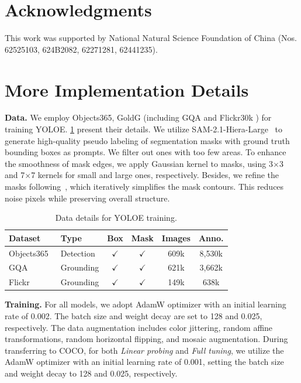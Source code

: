 \documentclass[10pt,twocolumn,letterpaper]{article}
\begin{document}
\section{Acknowledgments}
This work was supported by National Natural Science Foundation of China (Nos. 62525103, 624B2082, 62271281, 62441235).

{
    \small
    
    
}

\appendix

\section{More Implementation Details}
\textbf{Data.} We employ Objects365\cite{shao2019objects365}, GoldG \cite{kamath2021mdetr} (including GQA\cite{hudson2019gqa} and Flickr30k \cite{plummer2015flickr30k}) for training YOLOE. \cref{tab:dataset} present their details. We utilize SAM-2.1-Hiera-Large~\cite{ravi2024sam2} to generate high-quality pseudo labeling of segmentation masks with ground truth bounding boxes as prompts. We filter out ones with too few areas. To enhance the smoothness of mask edges, we apply Gaussian kernel to masks, using 3$\times$3 and 7$\times$7 kernels for small and large ones, respectively. Besides, we refine the masks following~\cite{douglas1973polydp}, which iteratively simplifies the mask contours. This reduces noise pixels while preserving overall structure.

\begin{table}[h]
\centering
\caption{Data details for YOLOE training.}
\label{tab:dataset}
\small
\setlength{\tabcolsep}{3pt}
\begin{tabular}{llcccc} 
\toprule
Dataset & Type & Box & Mask & Images & Anno. \\ 
\midrule
Objects365~\cite{shao2019objects365} & Detection & $\checkmark$ & $\checkmark$ & 609k & 8,530k \\
GQA~\cite{hudson2019gqa} & Grounding & $\checkmark$ & $\checkmark$ & 621k & 3,662k \\
Flickr~\cite{plummer2015flickr30k} & Grounding & $\checkmark$ & $\checkmark$ & 149k & 638k \\
\bottomrule
\end{tabular}
\end{table}

\textbf{Training.} For all models, we adopt AdamW optimizer with an initial learning rate of 0.002. The batch size and weight decay are set to 128 and 0.025, respectively. The data augmentation includes color jittering, random affine transformations, random horizontal flipping, and mosaic augmentation. During transferring to COCO, for both \textit{Linear probing} and \textit{Full tuning}, we utilize the AdamW optimizer with an initial learning rate of 0.001, setting the batch size and weight decay to 128 and 0.025, respectively.
\end{document}
